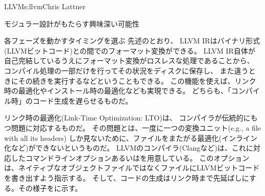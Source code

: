 \begin{aosachapter}{LLVM}{s:llvm}{Chris Lattner}
\begin{aosasect1}{モジュラー設計がもたらす興味深い可能性}
\begin{aosasect2}{各フェーズを動かすタイミングを選ぶ}
先述のとおり、
LLVM IRはバイナリ形式(LLVMビットコード)との間でのフォーマット変換ができる。
LLVM IR自体が自己完結しているうえにフォーマット変換がロスレスな処理であることから、
コンパイル処理の一部だけを行ってその状況をディスクに保存し、
また違うときにその続きを実行するなどということもできる。
この機能を使えば、リンク時の最適化やインストール時の最適化なども実現できる。
どちらも、「コンパイル時」のコード生成を遅らせるものだ。

リンク時の最適化(Link-Time Optimization: LTO)は、
コンパイラが伝統的にもつ問題に対応するものだ。
その問題とは、一度に一つの変換ユニット(e.g., a  file with all its headers)
しか見ないために、ファイルをまたがる最適化(インライン化など)ができないというものだ。
LLVMのコンパイラ(Clangなど)は、これに対応したコマンドラインオプションあるいはを用意している。
このオプションは、ネイティブなオブジェクトファイルではなくファイルにLLVMビットコードを書き出すよう指示する。
そして、コードの生成はリンク時まで先延ばしにする。その様子をに示す。



\end{aosasect2}
\end{aosasect1}
\end{aosachapter}
